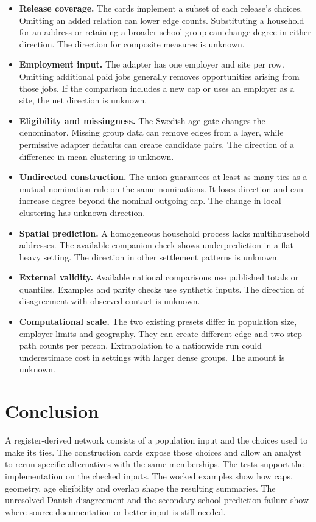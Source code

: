 \begin{itemize}
\item \textbf{Release coverage.} The cards implement a subset of each release's choices. Omitting an added relation can lower edge counts. Substituting a household for an address or retaining a broader school group can change degree in either direction. The direction for composite measures is unknown.
\item \textbf{Employment input.} The adapter has one employer and site per row. Omitting additional paid jobs generally removes opportunities arising from those jobs. If the comparison includes a new cap or uses an employer as a site, the net direction is unknown.
\item \textbf{Eligibility and missingness.} The Swedish age gate changes the denominator. Missing group data can remove edges from a layer, while permissive adapter defaults can create candidate pairs. The direction of a difference in mean clustering is unknown.
\item \textbf{Undirected construction.} The union guarantees at least as many ties as a mutual-nomination rule on the same nominations. It loses direction and can increase degree beyond the nominal outgoing cap. The change in local clustering has unknown direction.
\item \textbf{Spatial prediction.} A homogeneous household process lacks multihousehold addresses. The available companion check shows underprediction in a flat-heavy setting. The direction in other settlement patterns is unknown.
\item \textbf{External validity.} Available national comparisons use published totals or quantiles. Examples and parity checks use synthetic inputs. The direction of disagreement with observed contact is unknown.
\item \textbf{Computational scale.} The two existing presets differ in population size, employer limits and geography. They can create different edge and two-step path counts per person. Extrapolation to a nationwide run could underestimate cost in settings with larger dense groups. The amount is unknown.
\end{itemize}

\section{Conclusion}

A register-derived network consists of a population input and the choices used to make its ties. The \builtnet{} construction cards expose those choices and allow an analyst to rerun specific alternatives with the same memberships. The tests support the implementation on the checked inputs. The worked examples show how caps, geometry, age eligibility and overlap shape the resulting summaries. The unresolved Danish disagreement and the secondary-school prediction failure show where source documentation or better input is still needed.
